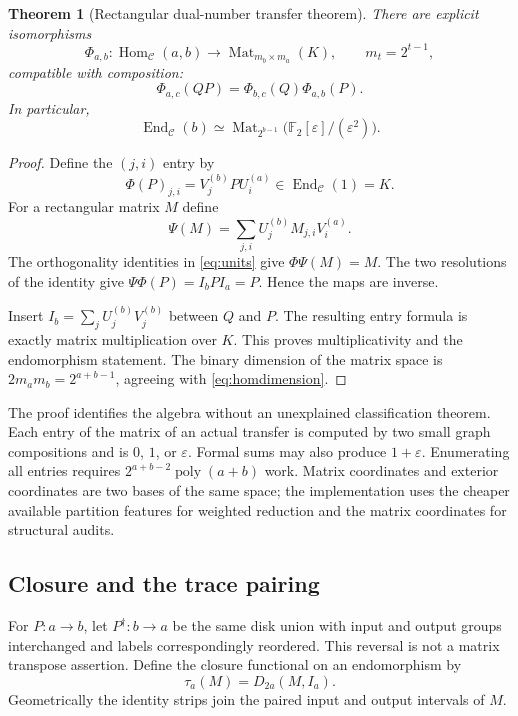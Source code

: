 \documentclass[11pt,a4paper]{article}
\newtheorem{theorem}{Theorem}[section]
\theoremstyle{definition}
\newcommand{\F}{\mathbb F_2}
\newcommand{\Mat}{\operatorname{Mat}}
\newcommand{\Hom}{\operatorname{Hom}}
\newcommand{\End}{\operatorname{End}}
\newcommand{\poly}{\operatorname{poly}}
\newcommand{\eps}{\varepsilon}
\begin{document}
\begin{theorem}[Rectangular dual-number transfer theorem]\label{thm:matrix}
There are explicit isomorphisms
\begin{equation}
\Phi_{a,b}:\Hom_{\mathcal C}(a,b)
\longrightarrow \Mat_{m_b\times m_a}(K),
\qquad m_t=2^{t-1},
\label{eq:matrix}
\end{equation}
compatible with composition:
\[
\Phi_{a,c}(QP)=\Phi_{b,c}(Q)\Phi_{a,b}(P).
\]
In particular,
\begin{equation}
\boxed{\End_{\mathcal C}(b)\simeq
\Mat_{2^{b-1}}\bigl(\F[\eps]/(\eps^2)\bigr).}
\label{eq:mainalgebra}
\end{equation}
\end{theorem}
\begin{proof}
Define the $(j,i)$ entry by
\[
\Phi(P)_{j,i}=V_j^{(b)}P U_i^{(a)}\in\End_{\mathcal C}(1)=K.
\]
For a rectangular matrix $M$ define
\[
\Psi(M)=\sum_{j,i}U_j^{(b)} M_{j,i} V_i^{(a)}.
\]
The orthogonality identities in \eqref{eq:units} give $\Phi\Psi(M)=M$. The two resolutions of the identity give $\Psi\Phi(P)=I_bPI_a=P$. Hence the maps are inverse.

Insert $I_b=\sum_j U_j^{(b)}V_j^{(b)}$ between $Q$ and $P$. The resulting entry formula is exactly matrix multiplication over $K$. This proves multiplicativity and the endomorphism statement. The binary dimension of the matrix space is $2m_am_b=2^{a+b-1}$, agreeing with \eqref{eq:homdimension}.
\end{proof}

The proof identifies the algebra without an unexplained classification theorem. Each entry of the matrix of an actual transfer is computed by two small graph compositions and is $0$, $1$, or $\eps$. Formal sums may also produce $1+\eps$. Enumerating all entries requires $2^{a+b-2}\poly(a+b)$ work. Matrix coordinates and exterior coordinates are two bases of the same space; the implementation uses the cheaper available partition features for weighted reduction and the matrix coordinates for structural audits.

\subsection{Closure and the trace pairing}
For $P:a\to b$, let $P^\dagger:b\to a$ be the same disk union with input and output groups interchanged and labels correspondingly reordered. This reversal is not a matrix transpose assertion. Define the closure functional on an endomorphism by
\[
\tau_a(M)=D_{2a}(M,I_a).
\]
Geometrically the identity strips join the paired input and output intervals of $M$.
\end{document}

